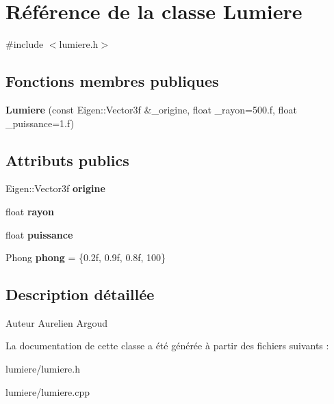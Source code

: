 \hypertarget{class_lumiere}{}\section{Référence de la classe Lumiere}
\label{class_lumiere}


{\ttfamily \#include $<$lumiere.\+h$>$}

\subsection*{Fonctions membres publiques}
\begin{DoxyCompactItemize}
\item 
\hypertarget{class_lumiere_a5425b244617e0940ea15ca57b44a6bfc}{}{\bfseries Lumiere} (const Eigen\+::\+Vector3f \&\+\_\+origine, float \+\_\+rayon=500.f, float \+\_\+puissance=1.f)\label{class_lumiere_a5425b244617e0940ea15ca57b44a6bfc}

\end{DoxyCompactItemize}
\subsection*{Attributs publics}
\begin{DoxyCompactItemize}
\item 
\hypertarget{class_lumiere_ab8142585162294560ab9598e9e2dd78a}{}Eigen\+::\+Vector3f {\bfseries origine}\label{class_lumiere_ab8142585162294560ab9598e9e2dd78a}

\item 
\hypertarget{class_lumiere_ac351fa40771c5f8e8366e7d91fa214f4}{}float {\bfseries rayon}\label{class_lumiere_ac351fa40771c5f8e8366e7d91fa214f4}

\item 
\hypertarget{class_lumiere_ac03697f99db8693398231bed7fd9a673}{}float {\bfseries puissance}\label{class_lumiere_ac03697f99db8693398231bed7fd9a673}

\item 
\hypertarget{class_lumiere_a01061e09d284ae42d6aafacdab2e269b}{}Phong {\bfseries phong} = \{0.\+2f, 0.\+9f, 0.\+8f, 100\}\label{class_lumiere_a01061e09d284ae42d6aafacdab2e269b}

\end{DoxyCompactItemize}


\subsection{Description détaillée}
\begin{DoxyAuthor}{Auteur}
Aurelien Argoud 
\end{DoxyAuthor}


La documentation de cette classe a été générée à partir des fichiers suivants \+:\begin{DoxyCompactItemize}
\item 
lumiere/lumiere.\+h\item 
lumiere/lumiere.\+cpp\end{DoxyCompactItemize}
